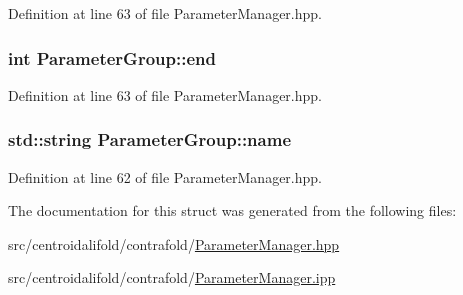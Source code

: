 Definition at line 63 of file Parameter\+Manager.\+hpp.

\hypertarget{struct_parameter_group_adc97d1628d57d1e23c7a047b57087916}{
\subsubsection[{end}]{\setlength{\rightskip}{0pt plus 5cm}int Parameter\+Group\+::end}}\label{struct_parameter_group_adc97d1628d57d1e23c7a047b57087916}


Definition at line 63 of file Parameter\+Manager.\+hpp.

\hypertarget{struct_parameter_group_a1c2c9357e7746d424afbd4361d0bc668}{
\subsubsection[{name}]{\setlength{\rightskip}{0pt plus 5cm}std\+::string Parameter\+Group\+::name}}\label{struct_parameter_group_a1c2c9357e7746d424afbd4361d0bc668}


Definition at line 62 of file Parameter\+Manager.\+hpp.



The documentation for this struct was generated from the following files\+:\begin{DoxyCompactItemize}
\item 
src/centroidalifold/contrafold/\hyperlink{centroidalifold_2contrafold_2_parameter_manager_8hpp}{Parameter\+Manager.\+hpp}\item 
src/centroidalifold/contrafold/\hyperlink{centroidalifold_2contrafold_2_parameter_manager_8ipp}{Parameter\+Manager.\+ipp}\end{DoxyCompactItemize}
